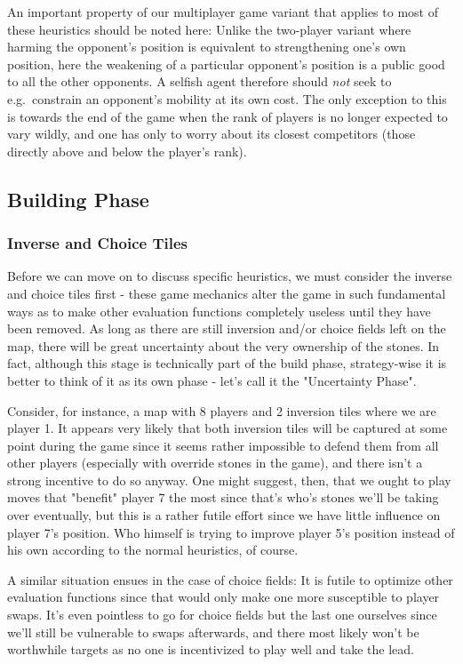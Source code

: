 \documentclass[a4paper,12pt]{article}
\begin{document}
An important property of our multiplayer game variant that applies to most of these heuristics should be noted here: Unlike the two-player variant where harming the opponent's position is equivalent to strengthening one's own position, here the weakening of a particular opponent's position is a public good to all the other opponents. A selfish agent therefore should \emph{not} seek to e.g.\ constrain an opponent's mobility at its own cost. The only exception to this is towards the end of the game when the rank of players is no longer expected to vary wildly, and one has only to worry about its closest competitors (those directly above and below the player's rank).

\subsection{Building Phase}

\subsubsection{Inverse and Choice Tiles}
Before we can move on to discuss specific heuristics, we must consider the inverse and choice tiles first - these game mechanics alter the game in such fundamental ways as to make other evaluation functions completely useless until they have been removed. As long as there are still inversion and/or choice fields left on the map, there will be great uncertainty about the very ownership of the stones. In fact, although this stage is technically part of the build phase, strategy-wise it is better to think of it as its own phase - let's call it the "Uncertainty Phase".

Consider, for instance, a map with 8 players and 2 inversion tiles where we are player 1. It appears very likely that both inversion tiles will be captured at some point during the game since it seems rather impossible to defend them from all other players (especially with override stones in the game), and there isn't a strong incentive to do so anyway. One might suggest, then, that we ought to play moves that "benefit" player 7 the most since that's who's stones we'll be taking over eventually, but this is a rather futile effort since we have little influence on player 7's position. Who himself is trying to improve player 5's position instead of his own according to the normal heuristics, of course.

A similar situation ensues in the case of choice fields: It is futile to optimize other evaluation functions since that would only make one more susceptible to player swaps. It's even pointless to go for choice fields but the last one ourselves since we'll still be vulnerable to swaps afterwards, and there most likely won't be worthwhile targets as no one is incentivized to play well and take the lead.
\end{document}
